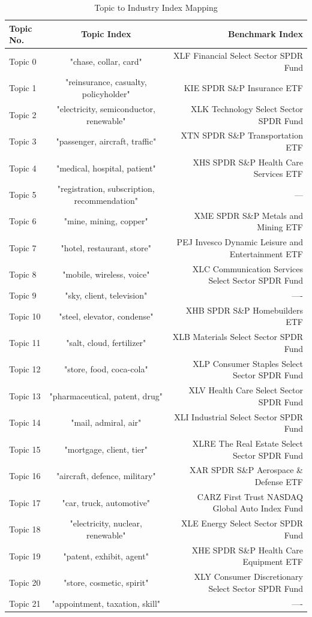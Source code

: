 \documentclass[12pt,journal,letterpaper,oneside,onecolumn]{IEEEtran}
\begin{document}
\begin{table}[!ht]
  \begin{center}
    \caption{Topic to Industry Index Mapping}
    \begin{tabular}{l|c|r}
      \textbf{Topic No.} & \textbf{Topic Index} & \textbf{Benchmark Index}\\
      \hline
      Topic 0 & "chase, collar, card" & XLF Financial Select Sector SPDR Fund \\
      Topic 1 & "reinsurance, casualty, policyholder" & KIE SPDR S\&P Insurance ETF \\
      Topic 2 & "electricity, semiconductor, renewable" & XLK Technology Select Sector SPDR Fund \\
      Topic 3 & "passenger, aircraft, traffic" & XTN SPDR S\&P Transportation ETF\\
      Topic 4 & "medical, hospital, patient" & XHS SPDR S\&P Health Care Services ETF \\
      Topic 5 & "registration, subscription, recommendation" & --- \\
      Topic 6 & "mine, mining, copper" & XME SPDR S\&P Metals and Mining ETF \\
      Topic 7 & "hotel, restaurant, store" & PEJ Invesco Dynamic Leisure and Entertainment ETF \\
      Topic 8 & "mobile, wireless, voice" & XLC Communication Services Select Sector SPDR Fund \\
      Topic 9 & "sky, client, television" & ---- \\
      Topic 10 & "steel, elevator, condense" & XHB SPDR S\&P Homebuilders ETF \\
      Topic 11 & "salt, cloud, fertilizer" & XLB Materials Select Sector SPDR Fund \\
      Topic 12 & "store, food, coca-cola" & XLP Consumer Staples Select Sector SPDR Fund \\
      Topic 13 & "pharmaceutical, patent, drug" & XLV Health Care Select Sector SPDR Fund \\
      Topic 14 & "mail, admiral, air" & XLI Industrial Select Sector SPDR Fund \\
      Topic 15 & "mortgage, client, tier" & XLRE The Real Estate Select Sector SPDR Fund  \\
      Topic 16 & "aircraft, defence, military" & XAR SPDR S\&P Aerospace \& Defense ETF \\
      Topic 17 & "car, truck, automotive" & CARZ First Trust NASDAQ Global Auto Index Fund \\
      Topic 18 & "electricity, nuclear, renewable" & XLE Energy Select Sector SPDR Fund \\
      Topic 19 & "patent, exhibit, agent" & XHE SPDR S\&P Health Care Equipment ETF \\
      Topic 20 & "store, cosmetic, spirit" & XLY Consumer Discretionary Select Sector SPDR Fund \\
      Topic 21 & "appointment, taxation, skill" & ---- \\
    \end{tabular}
  \end{center}
\end{table}
\end{document}
